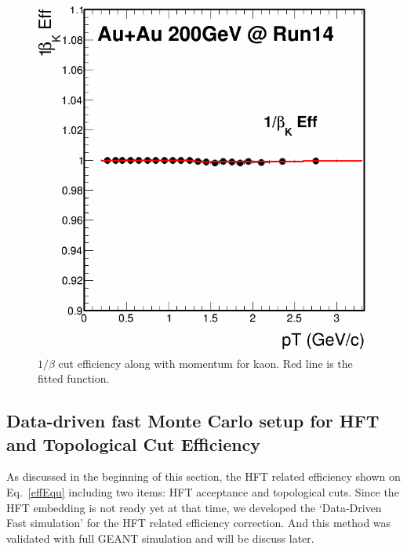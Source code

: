 \documentclass[a4paper]{article}
\begin{document}
\begin{figure}[htbp]
\begin{minipage}[htbp]{0.5\linewidth}
\includegraphics[width=1.0\textwidth]{fig/nSigKaonTof_eff.png}
\caption{$1/\beta$ cut efficiency along with momentum for kaon. Red line is the fitted function. \label{fig:kaontofeff}}
\end{minipage}
\end{figure}


\subsection{Data-driven fast Monte Carlo setup for HFT and Topological Cut Efficiency}

As discussed in the beginning of this section, the HFT related efficiency shown on Eq.~\ref{effEqu} including two items: HFT acceptance and topological cuts. Since the HFT embedding is not ready yet at that time, we developed the `Data-Driven Fast simulation' for the HFT related efficiency correction. And this method was validated with full GEANT simulation and will be discuss later.
\end{document}
